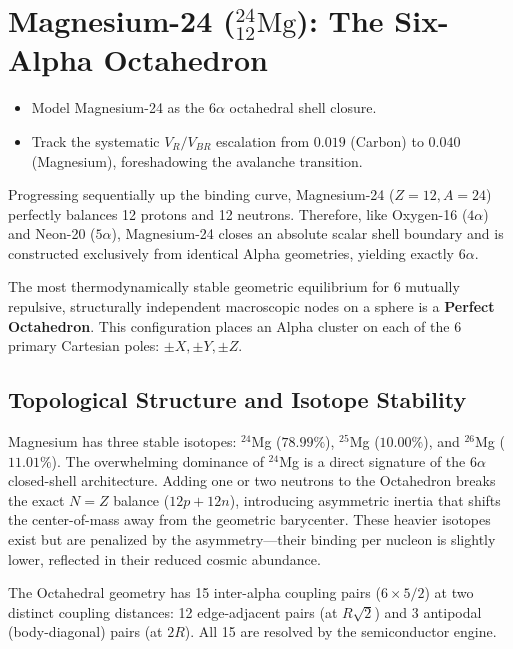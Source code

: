 \chapter{Magnesium-24 ($^{24}_{12}\text{Mg}$): The Six-Alpha Octahedron}
\label{ch:magnesium}

\begin{objectivebox}
\begin{itemize}
    \item Model Magnesium-24 as the $6\alpha$ octahedral shell closure.
    \item Track the systematic $V_R/V_{BR}$ escalation from $0.019$ (Carbon) to $0.040$ (Magnesium), foreshadowing the avalanche transition.
\end{itemize}
\end{objectivebox}


Progressing sequentially up the binding curve, Magnesium-24 ($Z=12, A=24$) perfectly balances 12 protons and 12 neutrons. Therefore, like Oxygen-16 ($4\alpha$) and Neon-20 ($5\alpha$), Magnesium-24 closes an absolute scalar shell boundary and is constructed exclusively from identical Alpha geometries, yielding exactly $6\alpha$.

The most thermodynamically stable geometric equilibrium for 6 mutually repulsive, structurally independent macroscopic nodes on a sphere is a \textbf{Perfect Octahedron}. This configuration places an Alpha cluster on each of the 6 primary Cartesian poles: $\pm X, \pm Y, \pm Z$.

\section{Topological Structure and Isotope Stability}
Magnesium has three stable isotopes: $^{24}$Mg ($78.99\%$), $^{25}$Mg ($10.00\%$), and $^{26}$Mg ($11.01\%$). The overwhelming dominance of $^{24}$Mg is a direct signature of the $6\alpha$ closed-shell architecture. Adding one or two neutrons to the Octahedron breaks the exact $N=Z$ balance ($12p + 12n$), introducing asymmetric inertia that shifts the center-of-mass away from the geometric barycenter. These heavier isotopes exist but are penalized by the asymmetry---their binding per nucleon is slightly lower, reflected in their reduced cosmic abundance.

The Octahedral geometry has 15 inter-alpha coupling pairs ($6 \times 5 / 2$) at two distinct coupling distances: 12 edge-adjacent pairs (at $R\sqrt{2}$) and 3 antipodal (body-diagonal) pairs (at $2R$). All 15 are resolved by the semiconductor engine.

